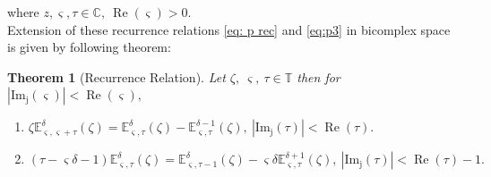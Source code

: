 \documentclass[a4paper,12pt]{article}
\newtheorem{theorem}{Theorem}[section]
\theoremstyle{remark}
\begin{document}
\noindent where  $z, \varsigma,\tau\in\mathbb{C}, ~\operatorname{Re}( \varsigma)>0.$\\
Extension of these recurrence relations \eqref{eq: p rec} and \eqref{eq:p3} in bicomplex space is given by following theorem:
\begin{theorem}[Recurrence Relation]\label{th: bc rec}
	Let $\zeta,~ \varsigma,~\tau \in\mathbb{T}$ then for $|\operatorname{Im_j}( \varsigma)|<\operatorname{Re}( \varsigma),$
    \begin{enumerate}[label=(\roman*)]
    \item $\zeta\mathbb{E}^\delta_{ \varsigma, \varsigma+\tau}(\zeta)=\mathbb{E}^\delta_{ \varsigma,\tau}(\zeta)-\mathbb{E}^{\delta-1}_{ \varsigma,\tau}(\zeta),~|\operatorname{Im_j}(\tau)|<\operatorname{Re}(\tau).$
        \item  
        $(\tau- \varsigma\delta-1)\mathbb{E}^{\delta}_{ \varsigma,\tau}(\zeta)=\mathbb{E}^{\delta}_{ \varsigma,\tau-1}(\zeta)- \varsigma\delta\mathbb{E}^{\delta+1}_{ \varsigma,\tau}(\zeta),~|\operatorname{Im_j}(\tau)|<\operatorname{Re}(\tau)-1.
$  \end{enumerate}


\end{theorem}
\end{document}
